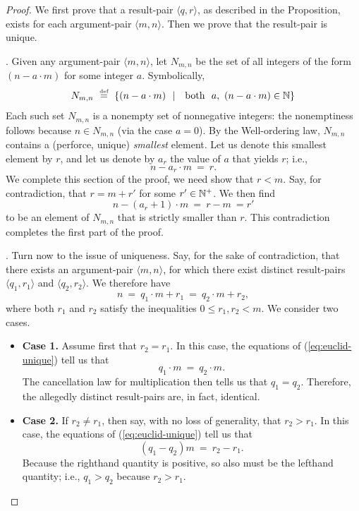 \begin{proof}
We first prove that a result-pair $\langle q, r \rangle$, as described in the Proposition, exists for each argument-pair $\langle m, n \rangle$.  Then we prove that the result-pair is unique.

\medskip

.
Given any argument-pair $\langle m, n \rangle$, let $N_{m,n}$ be the set of all integers of the form $(n - a \cdot m)$ for some integer $a$.  Symbolically,
\[ N_{m,n} \ \stackrel{\mbox{{\tiny def}}}{=} \ \{ (n - a \cdot m) \ \ | \ \  \mbox{ both } \  a,  \
(n - a \cdot m) \in \mathbb{N}  \}
\]
Each such set $N_{m,n}$ is a nonempty set of nonnegative integers: the nonemptiness follows because $n \in N_{m,n}$ (via the case $a=0$).  By the Well-ordering law, $N_{m,n}$ contains a (perforce, unique) {\em smallest} element.  Let us denote this smallest element by $r$, and let us denote by $a_r$ the value of $a$ that yields $r$; i.e.,
\[ n - a_r \cdot m \ = \ r.  \]
We complete this section of the proof, we need show that $r < m$.  Say, for contradiction, that $r = m+r'$ for some $r' \in \mathbb{N}^+$.  We then find
\[ n - (a_r +1)  \cdot m \ = \ r -m \ = r' \]
to be an element of $N_{m,n}$ that is strictly smaller than $r$.  This contradiction completes the first part of the proof.

\medskip

.
Turn now to the issue of uniqueness.  Say, for the sake of contradiction, that there exists an argument-pair $\langle m, n \rangle$, for which there exist distinct result-pairs $\langle q_1, r_1 \rangle$ and $\langle q_2, r_2 \rangle$.  We therefore have
\begin{equation}
\label{eq:euclid-unique}
n \ = \ q_1 \cdot m + r_1 \ = \ q_2 \cdot m + r_2,
\end{equation}
where both $r_1$ and $r_2$ satisfy the inequalities $0 \leq r_1, r_2 <m$.  We consider two cases.
\begin{itemize}
\item \textbf{Case 1.}
Assume first that $r_2 = r_1$.  In this case, the equations of (\ref{eq:euclid-unique}) tell us that
\[ q_1 \cdot m \ = \ q_2 \cdot m. \]
The cancellation law for multiplication then tells us that $q_1 = q_2$.  Therefore, the allegedly distinct result-pairs are, in fact, identical.

\medskip\item \textbf{Case 2.}
If $r_2 \neq r_1$, then say, with no loss of generality, that $r_2 > r_1$.  In this case, the equations of (\ref{eq:euclid-unique}) tell us that
\[ (q_1 - q_2) m \ = \ r_2 - r_1 . \]
Because the righthand quantity is positive, so also must be the lefthand quantity; i.e., $q_1 > q_2$ because $r_2 > r_1$.


\end{itemize}
\end{proof}
